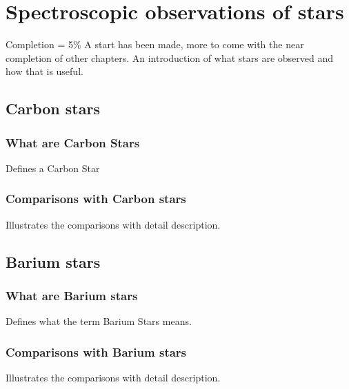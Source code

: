 \chapter{Spectroscopic observations of stars}

Completion = 5\%
A start has been made, more to come with the near completion of other chapters.
An introduction of what stars are observed and how that is useful.

\section{Carbon stars}

\subsection{What are Carbon Stars}

Defines a Carbon Star

\subsection{Comparisons with Carbon stars}

Illustrates the comparisons with detail description.

\section{Barium stars}

\subsection{What are Barium stars}

Defines what the term Barium Stars means.

\subsection{Comparisons with Barium stars}

Illustrates the comparisons with detail description.



